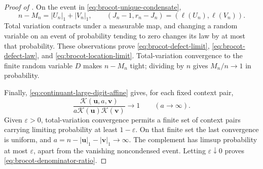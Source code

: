 \begin{proof}[Proof of ]
 On the event in \eqref{eq:brocot-unique-condensate},
\[
 n-M_n=|U_n|_1+|V_n|_1,
 \qquad
 (J_n-1,r_n-J_n)=(\ell(U_n),\ell(V_n)).
\]
Total variation contracts under a measurable map, and changing a random
variable on an event of probability tending to zero changes its law by at
most that probability.  These observations prove
\eqref{eq:brocot-defect-limit}, \eqref{eq:brocot-defect-law}, and
\eqref{eq:brocot-location-limit}.  Total-variation convergence to the
finite random variable \(D\) makes \(n-M_n\) tight; dividing by \(n\) gives
\(M_n/n\to1\) in probability.

Finally, \eqref{eq:continuant-large-digit-affine} gives, for each fixed
context pair,
\[
 \frac{\mathcal K(\mathbf u,a,\mathbf v)}
      {a\mathcal K(\mathbf u)\mathcal K(\mathbf v)}\longrightarrow1
 \qquad(a\to\infty).
\]
Given \(\varepsilon>0\), total-variation convergence permits a finite set
of context pairs carrying limiting probability at least \(1-\varepsilon\).
On that finite set the last convergence is uniform, and
\(a=n-|\mathbf u|_1-|\mathbf v|_1\to\infty\).  The complement has
limsup probability at most \(\varepsilon\), apart from the vanishing
noncondensed event.  Letting \(\varepsilon\downarrow0\) proves
\eqref{eq:brocot-denominator-ratio}.
\end{proof}
